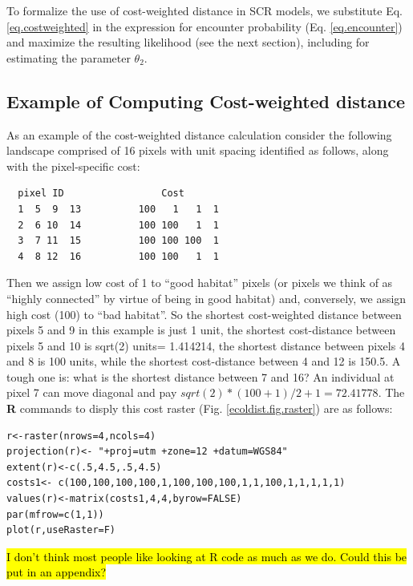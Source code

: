 \documentclass[12pt]{article}
\begin{document}
To formalize the use of cost-weighted distance in SCR models, we
substitute Eq. \ref{eq.costweighted} in the expression for encounter
probability (Eq. \ref{eq.encounter}) and maximize the resulting
likelihood (see the next section), including for estimating the
parameter $\theta_{2}$.




\subsection{Example of Computing Cost-weighted distance}

As an example of the cost-weighted distance calculation consider the
following landscape comprised of 16 pixels with unit spacing
identified as follows, along with the pixel-specific cost:
\begin{verbatim}
  pixel ID                 Cost
  1  5  9  13          100   1   1  1
  2  6 10  14          100 100   1  1
  3  7 11  15          100 100 100  1
  4  8 12  16          100 100   1  1
\end{verbatim}
Then we assign low cost of 1 to ``good habitat'' pixels (or pixels we
think of as ``highly connected'' by virtue of being in good habitat)
and, conversely, we assign high cost (100) to ``bad habitat''. So the
shortest cost-weighted distance between pixels 5 and 9 in this example
is just 1 unit, the shortest cost-distance between pixels 5 and 10 is
sqrt(2) units= 1.414214, the shortest distance between pixels 4 and 8 is 100
units, while the shortest cost-distance between 4 and 12 is 150.5. A
tough one is: what is the shortest distance between 7 and 16? An
individual at pixel 7 can move diagonal and pay  $sqrt(2)*(100+1)/2 + 1 =72.41778$.
The {\bf R} commands to disply this cost raster
(Fig. \ref{ecoldist.fig.raster})  are as follows:
\begin{verbatim}
r<-raster(nrows=4,ncols=4)
projection(r)<- "+proj=utm +zone=12 +datum=WGS84"
extent(r)<-c(.5,4.5,.5,4.5)
costs1<- c(100,100,100,100,1,100,100,100,1,1,100,1,1,1,1,1)
values(r)<-matrix(costs1,4,4,byrow=FALSE)
par(mfrow=c(1,1))
plot(r,useRaster=F)
\end{verbatim}

\hl{I don't think most people like looking at R code as much as we
  do. Could this be put in an appendix?}
\end{document}
